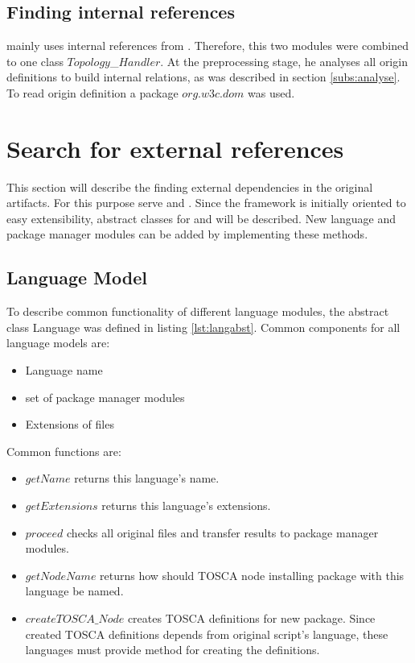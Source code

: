 \subsection*{Finding internal references}
 mainly uses internal references from .
Therefore, this two modules were combined to one class $Topology$\_$Handler$.	
At the preprocessing stage, he analyses all origin definitions to build internal relations, as was described in section \ref{subs:analyse}.
To read origin definition a package $org$.$w3c$.$dom$ was used.

\section{Search for external references}
This section will describe the finding external dependencies in the original artifacts.
For this purpose serve  and .
Since the framework is initially oriented to easy extensibility, abstract classes for  and  will be described.
New language and package manager modules can be added by implementing these methods.

\subsection*{Language Model}
To describe common functionality of different language modules, the abstract class Language was defined in listing \ref{lst:langabst}.
Common components for all language models are: 
\begin{itemize}
	\item Language name
	\item set of package manager modules
	\item Extensions of files
\end{itemize}
Common functions are: 
\begin{itemize}
	\item $getName$ returns this language's name.
	\item $getExtensions$ returns this language's extensions.
	\item $proceed$ checks all original files and transfer results to package manager modules.
	\item $getNodeName$ returns how should TOSCA node installing package with this language be named.
	\item $createTOSCA\_Node$ creates TOSCA definitions for new package. 
	Since created TOSCA definitions depends from original script's language, these languages must provide method for creating the definitions.
\end{itemize}

